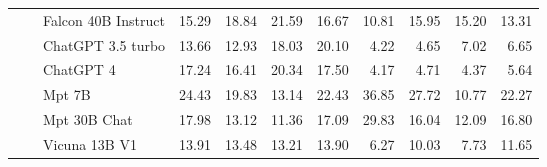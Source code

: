 \begin{table}[!htbp]
\begin{tabular}{l|l|l|rrrr|rrrr}
 &  & Falcon 40B Instruct  & {\cellcolor[HTML]{FDD8D5}} \color[HTML]{000000} 15.29 & {\cellcolor[HTML]{FCCBC6}} \color[HTML]{000000} 18.84 & {\cellcolor[HTML]{FCBFBE}} \color[HTML]{000000} 21.59 & {\cellcolor[HTML]{FDD3CF}} \color[HTML]{000000} 16.67 & {\cellcolor[HTML]{EBF7FA}} \color[HTML]{000000} 10.81 & {\cellcolor[HTML]{E0F3F5}} \color[HTML]{000000} 15.95 & {\cellcolor[HTML]{E2F4F7}} \color[HTML]{000000} 15.20 & {\cellcolor[HTML]{E6F5F9}} \color[HTML]{000000} 13.31 \\
 &  & ChatGPT 3.5 turbo & {\cellcolor[HTML]{FDDEDB}} \color[HTML]{000000} 13.66 & {\cellcolor[HTML]{FDE1DE}} \color[HTML]{000000} 12.93 & {\cellcolor[HTML]{FCCECA}} \color[HTML]{000000} 18.03 & {\cellcolor[HTML]{FCC6C2}} \color[HTML]{000000} 20.10 & {\cellcolor[HTML]{F6FCFD}} \color[HTML]{000000} 4.22 & {\cellcolor[HTML]{F5FBFD}} \color[HTML]{000000} 4.65 & {\cellcolor[HTML]{F1FAFC}} \color[HTML]{000000} 7.02 & {\cellcolor[HTML]{F2FAFC}} \color[HTML]{000000} 6.65 \\
 &  & ChatGPT 4 & {\cellcolor[HTML]{FCD1CD}} \color[HTML]{000000} 17.24 & {\cellcolor[HTML]{FDD4D0}} \color[HTML]{000000} 16.41 & {\cellcolor[HTML]{FCC6C1}} \color[HTML]{000000} 20.34 & {\cellcolor[HTML]{FCD0CC}} \color[HTML]{000000} 17.50 & {\cellcolor[HTML]{F6FCFD}} \color[HTML]{000000} 4.17 & {\cellcolor[HTML]{F5FBFD}} \color[HTML]{000000} 4.71 & {\cellcolor[HTML]{F6FCFD}} \color[HTML]{000000} 4.37 & {\cellcolor[HTML]{F4FBFC}} \color[HTML]{000000} 5.64 \\
 &  & Mpt 7B & {\cellcolor[HTML]{FBB0BA}} \color[HTML]{000000} 24.43 & {\cellcolor[HTML]{FCC7C3}} \color[HTML]{000000} 19.83 & {\cellcolor[HTML]{FDE1DE}} \color[HTML]{000000} 13.14 & {\cellcolor[HTML]{FBBABD}} \color[HTML]{000000} 22.43 & {\cellcolor[HTML]{8DD3C0}} \color[HTML]{000000} 36.85 & {\cellcolor[HTML]{BAE5DC}} \color[HTML]{000000} 27.72 & {\cellcolor[HTML]{EBF7FA}} \color[HTML]{000000} 10.77 & {\cellcolor[HTML]{D1EEE9}} \color[HTML]{000000} 22.27 \\
 &  & Mpt 30B Chat & {\cellcolor[HTML]{FCCECA}} \color[HTML]{000000} 17.98 & {\cellcolor[HTML]{FDE1DE}} \color[HTML]{000000} 13.12 & {\cellcolor[HTML]{FDE6E2}} \color[HTML]{000000} 11.36 & {\cellcolor[HTML]{FCD1CD}} \color[HTML]{000000} 17.09 & {\cellcolor[HTML]{B0E1D6}} \color[HTML]{000000} 29.83 & {\cellcolor[HTML]{E0F3F5}} \color[HTML]{000000} 16.04 & {\cellcolor[HTML]{E8F6FA}} \color[HTML]{000000} 12.09 & {\cellcolor[HTML]{DEF2F4}} \color[HTML]{000000} 16.80 \\
 &  & Vicuna 13B V1 & {\cellcolor[HTML]{FDDDDA}} \color[HTML]{000000} 13.91 & {\cellcolor[HTML]{FDDFDC}} \color[HTML]{000000} 13.48 & {\cellcolor[HTML]{FDE0DD}} \color[HTML]{000000} 13.21 & {\cellcolor[HTML]{FDDDDA}} \color[HTML]{000000} 13.90 & {\cellcolor[HTML]{F2FAFC}} \color[HTML]{000000} 6.27 & {\cellcolor[HTML]{ECF8FA}} \color[HTML]{000000} 10.03 & {\cellcolor[HTML]{F0F9FB}} \color[HTML]{000000} 7.73 & {\cellcolor[HTML]{E9F7FA}} \color[HTML]{000000} 11.65 \\

\end{tabular}
\end{table}
